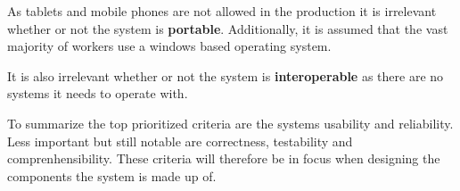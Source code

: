 As tablets and mobile phones are not allowed in the production it is irrelevant whether or not the system is \textbf{portable}.
Additionally, it is assumed that the vast majority of workers use a windows based operating system.

It is also irrelevant whether or not the system is \textbf{interoperable} as there are no systems it needs to operate with.

To summarize the top prioritized criteria are the systems usability and reliability.
Less important but still notable are correctness, testability and comprenhensibility.
These criteria will therefore be in focus when designing the components the system is made up of.
